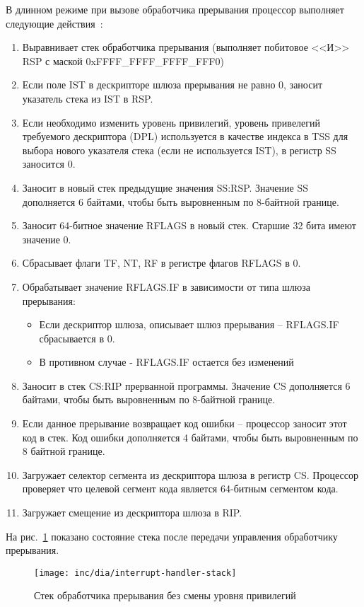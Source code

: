 В длинном режиме при вызове обработчика прерывания процессор выполняет
следующие действия~\cite{amd_pm_v2}:
\begin{enumerate}[1.]
\item Выравнивает стек обработчика прерывания (выполняет побитовое <<И>> RSP с маской 0xFFFF\_FFFF\_FFFF\_FFF0)
\item Если поле IST в дескрипторе шлюза прерывания не равно 0, заносит указатель стека из IST в RSP.
\item Если необходимо изменить уровень привилегий, уровень привелегий требуемого
	дескриптора (DPL) используется в качестве индекса в TSS для выбора
	нового указателя стека (если не используется IST), в регистр SS заносится 0.
\item Заносит в новый стек предыдущие значения SS:RSP. Значение SS дополняется
	6 байтами, чтобы быть выровненным по 8-байтной границе.
\item Заносит 64-битное значение RFLAGS в новый стек. Старшие 32 бита имеют
	значение 0.
\item Сбрасывает флаги TF, NT, RF в регистре флагов RFLAGS в 0.
\item Обрабатывает значение RFLAGS.IF в зависимости от типа шлюза прерывания:
	\begin{itemize}
	\item Если дескриптор шлюза, описывает шлюз прерывания -- RFLAGS.IF
		сбрасывается в 0.
	\item В противном случае - RFLAGS.IF остается без изменений
	\end{itemize}
\item Заносит в стек CS:RIP прерванной программы. Значение CS дополняется 6
	байтами, чтобы быть выровненным по 8-байтной границе.
\item Если данное прерывание возвращает код ошибки -- процессор заносит этот
	код в стек. Код ошибки дополняется 4 байтами, чтобы быть выровненным
	по 8 байтной границе.
\item Загружает селектор сегмента из дескриптора шлюза в регистр CS. Процессор
	проверяет что целевой сегмент кода является 64-битным сегментом кода.
\item Загружает смещение из дескриптора шлюза в RIP.
\end{enumerate}

На рис.~\ref{fig:interrupt_handler_stack} показано состояние стека после
передачи управления обработчику прерывания.

\begin{figure}[ht!]
  \centering
  \texttt{[image: inc/dia/interrupt-handler-stack]}
  \caption{Стек обработчика прерывания без смены уровня привилегий}
  \label{fig:interrupt_handler_stack}
\end{figure}

